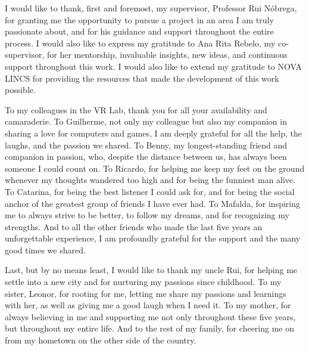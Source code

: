 
%

\begin{ntacknowledgements}

I would like to thank, first and foremost, my supervisor, Professor Rui Nóbrega, for granting me the opportunity to pursue a project in an 
area I am truly passionate about, and for his guidance and support throughout the entire process.
I would also like to express my gratitude to Ana Rita Rebelo, my co-supervisor, for her mentorship, invaluable insights, 
new ideas, and continuous support throughout this work. I would also like to extend my gratitude to NOVA LINCS for providing the 
resources that made the development of this work possible.

To my colleagues in the VR Lab, thank you for all your availability and camaraderie. To Guilherme, not only my colleague but also my 
companion in sharing a love for computers and games, I am deeply grateful for all the help, the laughs, and the passion we shared. 
To Benny, my longest-standing friend and companion in passion, who, despite the distance between us, has always been someone I could count on.
To Ricardo, for helping me keep my feet on the ground whenever my thoughts wandered too high and for being the funniest man alive. 
To Catarina, for being the best listener I could ask for, and for being the social anchor of the greatest group of friends I have ever had. 
To Mafalda, for inspiring me to always strive to be better, to follow my dreams, and for recognizing my strengths. 
And to all the other friends who made the last five years an unforgettable experience, I am profoundly grateful for the support 
and the many good times we shared.

Last, but by no means least, I would like to thank my uncle Rui, for helping me settle into a new city and for nurturing my passions 
since childhood. 
To my sister, Leonor, for rooting for me, letting me share my passions and learnings with her, as well as giving me a good laugh when I need it. 
To my mother, for always believing in me and supporting me not only throughout these five years, but throughout my entire life. 
And to the rest of my family, for cheering me on from my hometown on the other side of the country.

\end{ntacknowledgements}